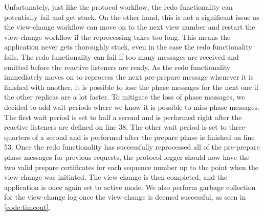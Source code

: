 Unfortunately, just like the protocol workflow, the redo functionality can potentially fail and get stuck. On the other hand, this is not a significant issue as the view-change workflow can move on to the next view number and restart the view-change workflow if the reprocessing takes too long. This means the application never gets thoroughly stuck, even in the case the redo functionality fails. The redo functionality can fail if too many messages are received and emitted before the reactive listeners are ready. As the redo functionality immediately moves on to reprocess the next pre-prepare message whenever it is finished with another, it is possible to lose the phase messages for the next one if the other replicas are a lot faster. To mitigate the loss of phase messages, we decided to add wait periods where we know it is possible to miss phase messages. The first wait period is set to half a second and is performed right after the reactive listeners are defined on line 38. The other wait period is set to three-quarters of a second and is performed after the prepare phase is finished on line 53. Once the redo functionality has successfully reprocessed all of the pre-prepare phase messages for previous requests, the protocol logger should now have the two valid prepare certificates for each sequence number up to the point when the view-change was initiated. The view-change is then completed, and the application is once again set to active mode. We also perform garbage collection for the view-change log once the view-change is deemed successful, as seen in \autoref{code:timeout}.

